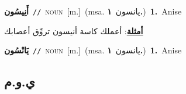 \documentclass[10pt,a4paper,twoside]{article} %
\begin{document}
\begin{multicols}{2}
{\setlength\topsep{0pt}\textbf{\foreignlanguage{arabic}{أَنِيسُون}}\ {\color{gray}\texttt{//}\color{black}}\ \textsc{noun}\ [m.]\ \color{gray}(msa. \foreignlanguage{arabic}{يانسون}~\foreignlanguage{arabic}{\textbf{١.}})\color{black}\ \textbf{1.}~Anise\  \begin{flushright}\color{gray}\foreignlanguage{arabic}{\textbf{\underline{\foreignlanguage{arabic}{أمثلة}}}: أعملك كاسة أنيسون تروِّق أعصابك}\end{flushright}\color{black}} \vspace{2mm}

{\setlength\topsep{0pt}\textbf{\foreignlanguage{arabic}{يَانْسُون}}\ {\color{gray}\texttt{//}\color{black}}\ \textsc{noun}\ [m.]\ \color{gray}(msa. \foreignlanguage{arabic}{يانسون}~\foreignlanguage{arabic}{\textbf{١.}})\color{black}\ \textbf{1.}~Anise\ } \vspace{2mm}

\vspace{-3mm}
\subsection*{\color{blue}\foreignlanguage{arabic}{ي.و.م}\color{blue}{}} 


\end{multicols}
\end{document}
